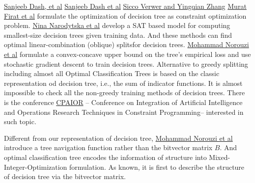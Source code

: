 \documentclass[UTF8]{article}
\begin{document}
\href{http://krvarshney.github.io/pubs/DashMV_icassp2015.pdf}{Sanjeeb Dash, et al}
\href{http://papers.nips.cc/paper/7716-boolean-decision-rules-via-column-generation.pdf}{Sanjeeb Dash et al}
\href{https://yingqianzhang.net/wp-content/uploads/2018/12/VerwerZhangAAAI-final.pdf}{Sicco Verwer and Yingqian Zhang}
\href{https://arxiv.org/pdf/1810.06684.pdf}{Murat Firat et al}
formulate the optimization of decision tree as constraint optimization problem.
\href{https://www.ijcai.org/proceedings/2018/0189.pdf}{Nina Narodytska et al}
develop a SAT based model for computing smallest-size decision trees given training data.
And these methods can find optimal linear-combination (oblique) splits\footnotemark  for decision trees.
\href{https://arxiv.org/abs/1511.04056}{Mohammad Norouzi et al} formulate a convex-concave upper bound
on the tree’s empirical loss and use stochastic gradient descent to train decision trees.
Alternative to greedy splitting including almost all Optimal Classification Trees
is based on the classic representation od decision tree, i.e.,
the sum of indicator functions.
It is almost impossible to check
all the non-greedy training methods of decision trees.
There is the conference \href{https://cpaior2017.dei.unipd.it/}{CPAIOR} --
Conference on Integration of Artificial Intelligence
and Operations Research Techniques in Constraint Programming--
interested in such topic.

Different from our representation of decision tree,
\href{https://arxiv.org/abs/1511.04056}{Mohammad Norouzi et al}
introduce a tree navigation function
rather than the bitvector matrix $B$.
And optimal classification tree encodes the information of structure
into Mixed-Integer-Optimization formulation.
As known, it is first to describe the structure of decision tree
via the bitvector matrix.
\end{document}
